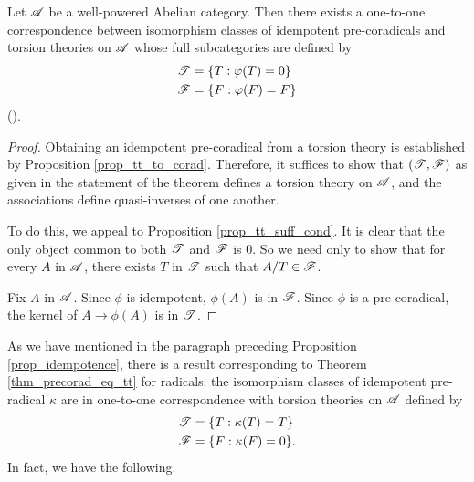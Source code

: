 \begin{thm}\label{thm_precorad_eq_tt}
Let $\mathscr{A}$ be a well-powered Abelian category. Then there exists
a one-to-one correspondence between isomorphism classes of idempotent pre-coradicals and
torsion theories on $\mathscr{A}$ whose full subcategories are defined 
by
\begin{align*}
\mathscr{T} &= \{ T : \varphi(T) = 0 \} \\
\mathscr{F} &= \{ F : \varphi(F) = F \}
\end{align*}
(\CF \cite[I2.9]{BJV}).
\end{thm}
\begin{proof}
Obtaining an idempotent pre-coradical from a torsion theory is
established by Proposition \ref{prop_tt_to_corad}. Therefore, it suffices
to show that $(\mathscr{T}, \mathscr{F})$ as given in the statement of the
theorem defines a torsion theory on $\mathscr{A}$, and the associations
define quasi-inverses of one another.

To do this, we appeal to Proposition \ref{prop_tt_suff_cond}. It is 
clear that the only object common to both $\mathscr{T}$
and $\mathscr{F}$ is $0$. So we need only to show that for every $A$ 
in $\mathscr{A}$, there exists $T$ in $\mathscr{T}$ such that $A/T \in 
\mathscr{F}$.

Fix $A$ in $\mathscr{A}$. Since $\phi$ is idempotent, $\phi(A)$ is 
in $\mathscr{F}$. Since $\phi$ is a pre-coradical, the kernel of $A
\to \phi(A)$ is in $\mathscr{T}$.
\end{proof}

As we have mentioned in the paragraph preceding Proposition
\ref{prop_idempotence}, there is a result corresponding to Theorem 
\ref{thm_precorad_eq_tt} for radicals: the isomorphism classes of idempotent 
pre-radical $\kappa$ are in one-to-one correspondence with torsion 
theories on $\mathscr{A}$ defined by 
\begin{align*}
\mathscr{T} &= \{ T : \kappa(T) = T \} \\
\mathscr{F} &= \{ F : \kappa(F) = 0 \}.
\end{align*}
In fact, we have the following.

